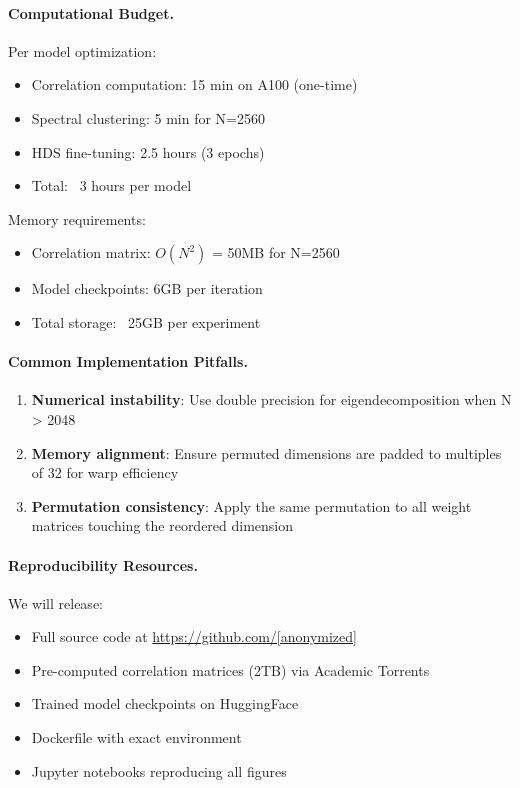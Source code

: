 \documentclass{article}
\begin{document}
\paragraph{Computational Budget.}
Per model optimization:
\begin{itemize}
    \item Correlation computation: 15 min on A100 (one-time)
    \item Spectral clustering: 5 min for N=2560
    \item HDS fine-tuning: 2.5 hours (3 epochs)
    \item Total: ~3 hours per model
\end{itemize}

Memory requirements:
\begin{itemize}
    \item Correlation matrix: $O(N^2)$ = 50MB for N=2560
    \item Model checkpoints: 6GB per iteration
    \item Total storage: ~25GB per experiment
\end{itemize}

\paragraph{Common Implementation Pitfalls.}
\begin{enumerate}
    \item \textbf{Numerical instability}: Use double precision for 
    eigendecomposition when N > 2048
    
    \item \textbf{Memory alignment}: Ensure permuted dimensions are 
    padded to multiples of 32 for warp efficiency
    
    \item \textbf{Permutation consistency}: Apply the same permutation 
    to all weight matrices touching the reordered dimension
\end{enumerate}

\paragraph{Reproducibility Resources.}
We will release:
\begin{itemize}
    \item Full source code at \url{https://github.com/[anonymized]}
    \item Pre-computed correlation matrices (2TB) via Academic Torrents
    \item Trained model checkpoints on HuggingFace
    \item Dockerfile with exact environment
    \item Jupyter notebooks reproducing all figures
\end{itemize}
\end{document}
